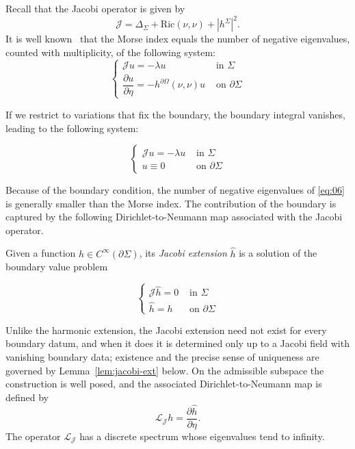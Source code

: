 \documentclass[11pt]{article}
\theoremstyle{definition}
\theoremstyle{plain}
\begin{document}
Recall that the Jacobi operator is given by
\begin{equation}
	\mathcal{J} = \Delta_\Sigma + \mathrm{Ric}(\nu, \nu) + |h^\Sigma|^2.
\end{equation}
It is well known~\cite{maximo01, ambrozio01, sargent01} that the Morse index equals the number of negative eigenvalues, counted with multiplicity, of the following system:
\begin{equation}
	\begin{cases}
		\mathcal{J}u = -\lambda u                                             & \text{ in } \Sigma          \\
		\dfrac{\partial u}{\partial \eta} = - h^{\partial \Omega} (\nu, \nu)u & \text{ on } \partial \Sigma
	\end{cases}
\end{equation}

If we restrict to variations that fix the boundary, the boundary integral vanishes, leading to the following system:

\begin{equation}\label{eq:06}
	\begin{cases}
		\mathcal{J} u = - \lambda u & \text{ in } \Sigma          \\
		u \equiv 0                  & \text{ on } \partial \Sigma
	\end{cases}
\end{equation}

Because of the boundary condition, the number of negative eigenvalues of \eqref{eq:06} is generally smaller than the Morse index. The contribution of the boundary is captured by the following Dirichlet-to-Neumann map associated with the Jacobi operator.

Given a function $h \in C^\infty(\partial \Sigma)$, its \emph{Jacobi extension} $\hat{h}$ is a solution of the boundary value problem

\begin{equation}\label{eq:jacobi-ext}
	\begin{cases}
		\mathcal{J} \hat{h} = 0 & \text{ in } \Sigma          \\
		\hat{h} = h             & \text{ on } \partial \Sigma
	\end{cases}
\end{equation}

Unlike the harmonic extension, the Jacobi extension need not exist for every boundary datum, and when it does it is determined only up to a Jacobi field with vanishing boundary data; existence and the precise sense of uniqueness are governed by Lemma~\ref{lem:jacobi-ext} below. On the admissible subspace the construction is well posed, and the associated Dirichlet-to-Neumann map is defined by
\begin{equation}\label{eq:08}
	\mathcal{L}_\mathcal{J} h = \dfrac{\partial \hat{h}}{\partial \eta}.
\end{equation}
The operator $\mathcal{L}_\mathcal{J}$ has a discrete spectrum whose eigenvalues tend to infinity.
\end{document}

